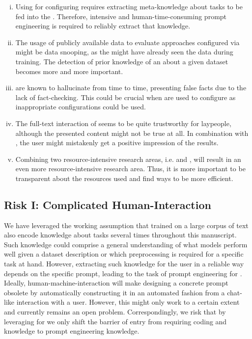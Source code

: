 \begin{enumerate}[(i)]
    \item Using \LLMs for configuring \AutoML requires extracting meta-knowledge about \AutoML tasks to be fed into the \LLMs. Therefore, intensive and human-time-consuming prompt engineering is required to reliably extract that knowledge.
    \item The usage of publicly available data to evaluate \AutoML approaches configured via \LLMs might be data snooping, as the \LLM might have already seen the data during training. The detection of prior knowledge of an \LLM about a given dataset becomes more and more important.
    \item \LLMs are known to hallucinate from time to time, presenting false facts due to the lack of fact-checking. This could be crucial when \LLMs are used to configure \AutoML as inappropriate configurations could be used.
    \item The full-text interaction of \LLMs seems to be quite trustworthy for laypeople, although the presented content might not be true at all. In combination with \AutoML, the user might mistakenly get a positive impression of the results.
    \item Combining two resource-intensive research areas, i.e. \LLMs and \AutoML, will result in an even more resource-intensive research area. Thus, it is more important to be transparent about the resources used and find ways to be more efficient.
\end{enumerate}

\subsection{Risk I: Complicated Human-Interaction} We have leveraged the working assumption that \LLMs trained on a large corpus of text also encode knowledge about \AutoML tasks several times throughout this manuscript. Such knowledge could comprise a general understanding of what models perform well given a dataset description or which preprocessing is required for a specific task at hand. However, extracting such knowledge for the user in a reliable way depends on the specific prompt, leading to the task of prompt engineering for \AutoML \cite{sorensen-etal-2022-information}. Ideally, human-machine-interaction will make designing a concrete prompt obsolete by automatically constructing it in an automated fashion from a chat-like interaction with a user. However, this might only work to a certain extent and currently remains an open problem. Correspondingly, we risk that by leveraging \LLMs for \AutoML we only shift the barrier of entry from requiring coding and \ML knowledge to prompt engineering knowledge.

